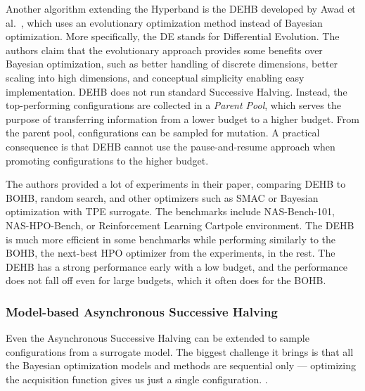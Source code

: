 Another algorithm extending the Hyperband is the DEHB developed by Awad et al.~\cite{awad2021dehb}, which uses an evolutionary optimization method instead of Bayesian optimization. More specifically, the DE stands for Differential Evolution. The authors claim that the evolutionary approach provides some benefits over Bayesian optimization, such as better handling of discrete dimensions, better scaling into high dimensions, and conceptual simplicity enabling easy implementation. DEHB does not run standard Successive Halving. Instead, the top-performing configurations are collected in a \textit{Parent Pool}, which serves the purpose of transferring information from a lower budget to a higher budget. From the parent pool, configurations can be sampled for mutation. A practical consequence is that DEHB cannot use the pause-and-resume approach when promoting configurations to the higher budget. 


The authors provided a lot of experiments in their paper, comparing DEHB to BOHB, random search, and other optimizers such as SMAC or Bayesian optimization with TPE surrogate. The benchmarks include NAS-Bench-101, NAS-HPO-Bench, or Reinforcement Learning Cartpole environment. The DEHB is much more efficient in some benchmarks while performing similarly to the BOHB, the next-best HPO optimizer from the experiments, in the rest. The DEHB has a strong performance early with a low budget, and the performance does not fall off even for large budgets, which it often does for the BOHB.

\subsubsection{Model-based Asynchronous Successive Halving}
Even the Asynchronous Successive Halving can be extended to sample configurations from a surrogate model. The biggest challenge it brings is that all the Bayesian optimization models and methods are sequential only --- optimizing the acquisition function gives us just a single configuration. .

